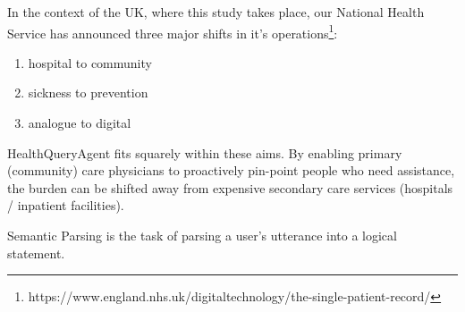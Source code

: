 \documentclass[11pt]{article}
\begin{document}


In the context of the UK, where this study takes place, our National Health Service has announced three major shifts in it's operations\footnote{https://www.england.nhs.uk/digitaltechnology/the-single-patient-record/}:

\begin{enumerate}
	\item hospital to community
	\item sickness to prevention
	\item analogue to digital
\end{enumerate}

HealthQueryAgent fits squarely within these aims. By enabling primary (community) care physicians to proactively pin-point people who need assistance, the burden can be shifted away from expensive secondary care services (hospitals / inpatient facilities).


Semantic Parsing is the task of parsing a user's utterance into a logical statement.

\citet{ziletti_retrieval_2024} \citet{ziletti_generating_2025}
\end{document}
